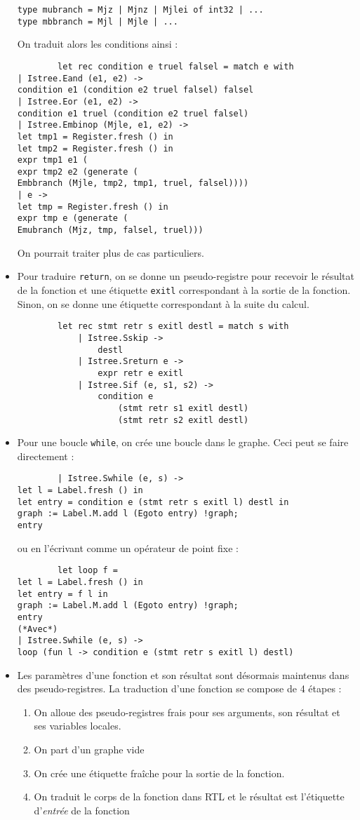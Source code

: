 \documentclass{cours}
\begin{document}
\begin{itemize}
\begin{verbatim}
type mubranch = Mjz | Mjnz | Mjlei of int32 | ...
type mbbranch = Mjl | Mjle | ...
    \end{verbatim}
    On traduit alors les conditions ainsi : 
    \begin{verbatim}
        let rec condition e truel falsel = match e with
| Istree.Eand (e1, e2) ->
condition e1 (condition e2 truel falsel) falsel
| Istree.Eor (e1, e2) ->
condition e1 truel (condition e2 truel falsel)
| Istree.Embinop (Mjle, e1, e2) ->
let tmp1 = Register.fresh () in
let tmp2 = Register.fresh () in
expr tmp1 e1 (
expr tmp2 e2 (generate (
Embbranch (Mjle, tmp2, tmp1, truel, falsel))))
| e ->
let tmp = Register.fresh () in
expr tmp e (generate (
Emubranch (Mjz, tmp, falsel, truel)))
    \end{verbatim}
    On pourrait traiter plus de cas particuliers.
    \item Pour traduire \texttt{return}, on se donne un pseudo-registre pour recevoir le résultat de la fonction et une étiquette \texttt{exitl} correspondant à la sortie de la fonction. Sinon, on se donne une étiquette correspondant à la suite du calcul. 
    \begin{verbatim}
        let rec stmt retr s exitl destl = match s with
            | Istree.Sskip ->
                destl
            | Istree.Sreturn e ->
                expr retr e exitl
            | Istree.Sif (e, s1, s2) ->
                condition e
                    (stmt retr s1 exitl destl)
                    (stmt retr s2 exitl destl)
    \end{verbatim}
    \item Pour une boucle \texttt{while}, on crée une boucle dans le graphe. Ceci peut se faire directement : 
    \begin{verbatim}
        | Istree.Swhile (e, s) ->
let l = Label.fresh () in
let entry = condition e (stmt retr s exitl l) destl in
graph := Label.M.add l (Egoto entry) !graph;
entry
    \end{verbatim}
    ou en l'écrivant comme un opérateur de point fixe : 
    \begin{verbatim}
        let loop f =
let l = Label.fresh () in
let entry = f l in
graph := Label.M.add l (Egoto entry) !graph;
entry
(*Avec*)
| Istree.Swhile (e, s) ->
loop (fun l -> condition e (stmt retr s exitl l) destl)
    \end{verbatim}
    \item Les paramètres d'une fonction et son résultat sont désormais maintenus dans des pseudo-registres. La traduction d'une fonction se compose de 4 étapes : 
    \begin{enumerate}
        \item On alloue des pseudo-registres frais pour ses arguments, son résultat et ses variables locales.
        \item On part d'un graphe vide
        \item On crée une étiquette fraîche pour la sortie de la fonction.
        \item On traduit le corps de la fonction dans RTL et le résultat est l'étiquette d'\emph{entrée} de la fonction
    \end{enumerate}
\end{itemize}
\end{document}
